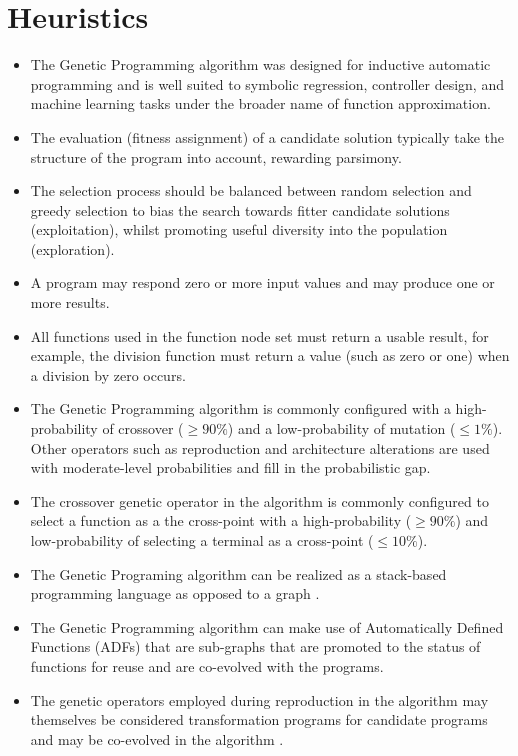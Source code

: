 \documentclass[a4paper, 11pt]{article}
\begin{document}
\section{Heuristics}
\label{sec:heuristics}
\begin{itemize}
	\item The Genetic Programming algorithm was designed for inductive automatic programming and is well suited to symbolic regression, controller design, and machine learning tasks under the broader name of function approximation.
	\item The evaluation (fitness assignment) of a candidate solution typically take the structure of the program into account, rewarding parsimony.
	\item The selection process should be balanced between random selection and greedy selection to bias the search towards fitter candidate solutions (exploitation), whilst promoting useful diversity into the population (exploration).
	\item A program may respond zero or more input values and may produce one or more results.
	\item All functions used in the function node set must return a usable result, for example, the division function must return a value (such as zero or one) when a division by zero occurs.
	\item The Genetic Programming algorithm is commonly configured with a high-probability of crossover ($\geq 90\%$) and a low-probability of mutation ($\leq 1\%$). Other operators such as reproduction and architecture alterations are used with moderate-level probabilities and fill in the probabilistic gap.
	\item The crossover genetic operator in the algorithm is commonly configured to select a function as a the cross-point with a high-probability ($\geq 90\%$) and low-probability of selecting a terminal as a cross-point ($\leq 10\%$).
	\item The Genetic Programing algorithm can be realized as a stack-based programming language as opposed to a graph \cite{Perkis1994}.
	\item The Genetic Programming algorithm can make use of Automatically Defined Functions (ADFs) that are sub-graphs that are promoted to the status of functions for reuse and are co-evolved with the programs. 
	 \item The genetic operators employed during reproduction in the algorithm may themselves be considered transformation programs for candidate programs and may be co-evolved in the algorithm \cite{Angeline1996}.
\end{itemize}
\end{document}
